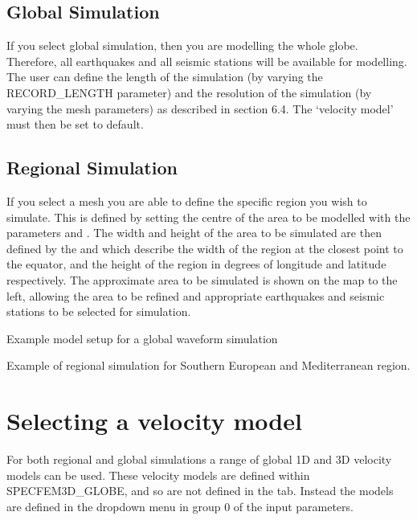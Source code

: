 \documentclass[english]{book}
\begin{document}
\subsection{Global Simulation}
\label{\detokenize{Section6:global-simulation}}
If you select global simulation, then you are modelling the whole globe.
Therefore, all earthquakes and all seismic stations will be available
for modelling. The user can define the length of the simulation (by
varying the RECORD\_LENGTH parameter) and the resolution of the
simulation (by varying the mesh parameters) as described in section 6.4.
The ‘velocity model’ must then be set to default.


\subsection{Regional Simulation}
\label{\detokenize{Section6:regional-simulation}}
If you select a  mesh you are able to define the specific
region you wish to simulate. This is defined by setting the centre of
the area to be modelled with the parameters
 and
. The width and height of the area to
be simulated are then defined by the 
and  which describe the width of the
region at the closest point to the equator, and the height of the region
in degrees of longitude and latitude respectively. The approximate area
to be simulated is shown on the map to the left, allowing the area to be
refined and appropriate earthquakes and seismic stations to be selected
for simulation.


 Example model setup for a global waveform simulation


 Example of regional simulation for Southern European
and Mediterranean region.


\section{Selecting a velocity model}
\label{\detokenize{Section6:selecting-a-velocity-model}}
For both regional and global simulations a range of global 1D and 3D
velocity models can be used. These velocity models are defined within
SPECFEM3D\_GLOBE, and so are not defined in the  tab.
Instead the models are defined in the dropdown  menu in group 0
of the input parameters.
\end{document}
